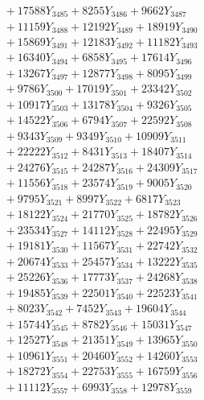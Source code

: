 \documentclass[a4paper,10pt]{article}
\begin{document}
{\begin{align}
&\;  + 17588 Y_{3485} + 8255 Y_{3486} + 9662 Y_{3487} \\[0.3ex]
&\;  + 11159 Y_{3488} + 12192 Y_{3489} + 18919 Y_{3490} \\[0.3ex]
&\;  + 15869 Y_{3491} + 12183 Y_{3492} + 11182 Y_{3493} \\[0.3ex]
&\;  + 16340 Y_{3494} + 6858 Y_{3495} + 17614 Y_{3496} \\[0.3ex]
&\;  + 13267 Y_{3497} + 12877 Y_{3498} + 8095 Y_{3499} \\[0.3ex]
&\;  + 9786 Y_{3500} + 17019 Y_{3501} + 23342 Y_{3502} \\[0.3ex]
&\;  + 10917 Y_{3503} + 13178 Y_{3504} + 9326 Y_{3505} \\[0.3ex]
&\;  + 14522 Y_{3506} + 6794 Y_{3507} + 22592 Y_{3508} \\[0.5ex]\allowbreak
&\;  + 9343 Y_{3509} + 9349 Y_{3510} + 10909 Y_{3511} \\[0.3ex]
&\;  + 22222 Y_{3512} + 8431 Y_{3513} + 18407 Y_{3514} \\[0.3ex]
&\;  + 24276 Y_{3515} + 24287 Y_{3516} + 24309 Y_{3517} \\[0.3ex]
&\;  + 11556 Y_{3518} + 23574 Y_{3519} + 9005 Y_{3520} \\[0.3ex]
&\;  + 9795 Y_{3521} + 8997 Y_{3522} + 6817 Y_{3523} \\[0.3ex]
&\;  + 18122 Y_{3524} + 21770 Y_{3525} + 18782 Y_{3526} \\[0.3ex]
&\;  + 23534 Y_{3527} + 14112 Y_{3528} + 22495 Y_{3529} \\[0.3ex]
&\;  + 19181 Y_{3530} + 11567 Y_{3531} + 22742 Y_{3532} \\[0.3ex]
&\;  + 20674 Y_{3533} + 25457 Y_{3534} + 13222 Y_{3535} \\[0.3ex]
&\;  + 25226 Y_{3536} + 17773 Y_{3537} + 24268 Y_{3538} \\[0.5ex]\allowbreak
&\;  + 19485 Y_{3539} + 22501 Y_{3540} + 22523 Y_{3541} \\[0.3ex]
&\;  + 8023 Y_{3542} + 7452 Y_{3543} + 19604 Y_{3544} \\[0.3ex]
&\;  + 15744 Y_{3545} + 8782 Y_{3546} + 15031 Y_{3547} \\[0.3ex]
&\;  + 12527 Y_{3548} + 21351 Y_{3549} + 13965 Y_{3550} \\[0.3ex]
&\;  + 10961 Y_{3551} + 20460 Y_{3552} + 14260 Y_{3553} \\[0.3ex]
&\;  + 18272 Y_{3554} + 22753 Y_{3555} + 16759 Y_{3556} \\[0.3ex]
&\;  + 11112 Y_{3557} + 6993 Y_{3558} + 12978 Y_{3559} \\[0.3ex]

\end{align}}
\end{document}
